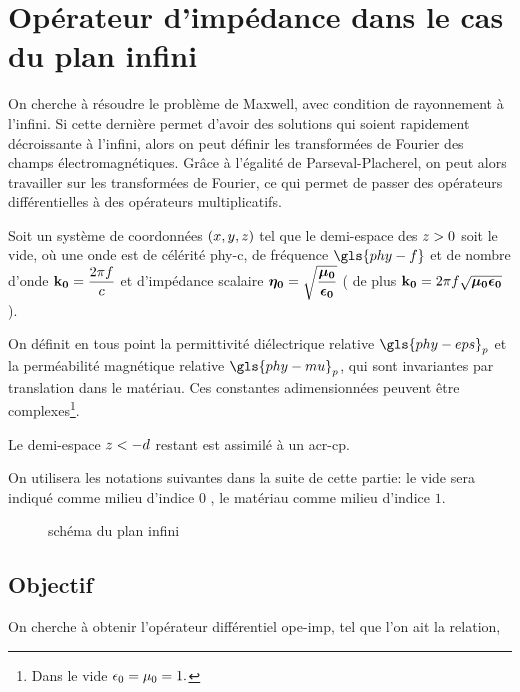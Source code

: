 \section{Opérateur d'impédance dans le cas du plan infini}\label{sec:coeffs_ref}

On cherche à résoudre le problème de Maxwell, avec condition de rayonnement à l'infini. Si cette dernière permet d'avoir des solutions qui soient rapidement décroissante à l'infini, alors on peut définir les transformées de Fourier des champs électromagnétiques. Grâce à l'égalité de Parseval-Placherel, on peut alors travailler sur les transformées de Fourier, ce qui permet de passer des opérateurs différentielles à des opérateurs multiplicatifs.





Soit un système de coordonnées $(\x,\y,\z)$ tel que le demi-espace des $\z>0$ soit le vide, où une onde est de célérité \gls{phy-c}, de fréquence $\gls{phy-f}$ et de nombre d'onde $\kO=\frac{2\pi f}{c}$  et d'impédance scalaire $\etaO = \sqrt{\frac{\muO}{\epsO}}$ ( de plus $\kO=2\pi f\sqrt{\muO\epsO}$ ).

On définit en tous point la permittivité diélectrique relative $\gls{phy-eps}_p$ et la perméabilité magnétique relative $\gls{phy-mu}_p$, qui sont invariantes par translation dans le matériau.
 Ces constantes adimensionnées peuvent être complexes\footnote{Dans le vide $\eps_0=\mu_0=1.$}.

Le demi-espace $\z<-d$ restant est assimilé à un \gls{acr-cp}.

On utilisera les notations  suivantes dans la suite de cette partie: le vide sera indiqué comme milieu d'indice $0$ , le matériau comme milieu d'indice $1$.

\begin{figure}[h!]
\centering
\begin{tikzpicture}

\end{tikzpicture}
\caption{schéma du plan infini}
\end{figure}\label{fig:tikz:plan}

\subsection{Objectif}
On cherche à obtenir l'opérateur différentiel \gls{ope-imp}, tel que l'on ait la relation,

